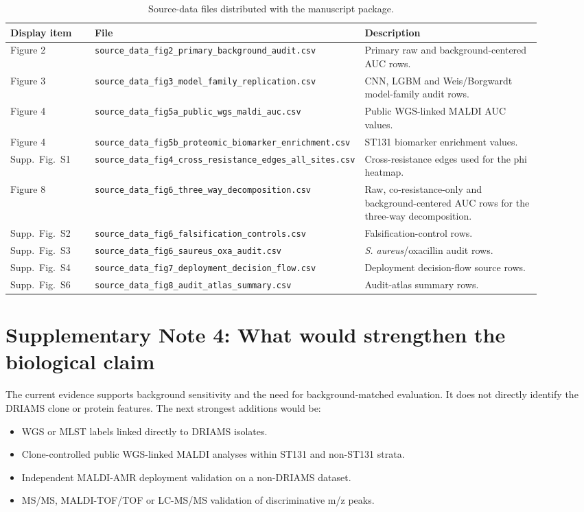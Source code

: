 \documentclass[11pt]{article}
\begin{document}
\begin{table}[ht]
\centering
\scriptsize
\caption{Source-data files distributed with the manuscript package.}
\begin{tabular}{p{0.16\linewidth}p{0.40\linewidth}p{0.34\linewidth}}
\toprule
Display item & File & Description \\
\midrule
Figure 2 & \texttt{source\_data\_fig2\_primary\_background\_audit.csv} & Primary raw and background-centered AUC rows. \\
Figure 3 & \texttt{source\_data\_fig3\_model\_family\_replication.csv} & CNN, LGBM and Weis/Borgwardt model-family audit rows. \\
Figure 4 & \texttt{source\_data\_fig5a\_public\_wgs\_maldi\_auc.csv} & Public WGS-linked MALDI AUC values. \\
Figure 4 & \texttt{source\_data\_fig5b\_proteomic\_biomarker\_enrichment.csv} & ST131 biomarker enrichment values. \\
Supp.\ Fig.\ S1 & \texttt{source\_data\_fig4\_cross\_resistance\_edges\_all\_sites.csv} & Cross-resistance edges used for the phi heatmap. \\
Figure 8 & \texttt{source\_data\_fig6\_three\_way\_decomposition.csv} & Raw, co-resistance-only and background-centered AUC rows for the three-way decomposition. \\
Supp.\ Fig.\ S2 & \texttt{source\_data\_fig6\_falsification\_controls.csv} & Falsification-control rows. \\
Supp.\ Fig.\ S3 & \texttt{source\_data\_fig6\_saureus\_oxa\_audit.csv} & \textit{S. aureus}/oxacillin audit rows. \\
Supp.\ Fig.\ S4 & \texttt{source\_data\_fig7\_deployment\_decision\_flow.csv} & Deployment decision-flow source rows. \\
Supp.\ Fig.\ S6 & \texttt{source\_data\_fig8\_audit\_atlas\_summary.csv} & Audit-atlas summary rows. \\
\bottomrule
\end{tabular}
\end{table}

\section*{Supplementary Note 4: What would strengthen the biological claim}

The current evidence supports background sensitivity and the need for background-matched evaluation. It does not directly identify the DRIAMS clone or protein features. The next strongest additions would be:

\begin{itemize}
  \item WGS or MLST labels linked directly to DRIAMS isolates.
  \item Clone-controlled public WGS-linked MALDI analyses within ST131 and non-ST131 strata.
  \item Independent MALDI-AMR deployment validation on a non-DRIAMS dataset.
  \item MS/MS, MALDI-TOF/TOF or LC-MS/MS validation of discriminative m/z peaks.
\end{itemize}
\end{document}
